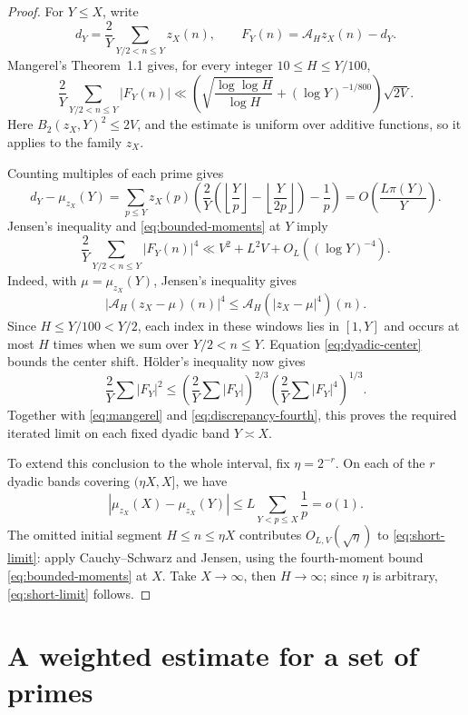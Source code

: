 \documentclass[11pt]{article}
\numberwithin{equation}{section}
\begin{document}
\begin{proof}
For $Y\le X$, write
\[
 d_Y=\frac2Y\sum_{Y/2<n\le Y}z_X(n),\qquad
 F_Y(n)=\mathcal A_Hz_X(n)-d_Y.
\]
Mangerel's Theorem~1.1 \cite{Mangerel} gives, for every integer
$10\le H\le Y/100$,
\begin{equation}\label{eq:mangerel}
 \frac2Y\sum_{Y/2<n\le Y}|F_Y(n)|
 \ll\left(\sqrt{\frac{\log\log H}{\log H}}
                +(\log Y)^{-1/800}\right)\sqrt{2V}.
\end{equation}
Here $B_2(z_X,Y)^2\le 2V$, and the estimate is uniform over additive
functions, so it applies to the family $z_X$.

Counting multiples of each prime gives
\begin{equation}\label{eq:dyadic-center}
 d_Y-\mu_{z_X}(Y)
 =\sum_{p\le Y}z_X(p)
 \left(\frac2Y\left(\left\lfloor\frac Yp\right\rfloor
       -\left\lfloor\frac Y{2p}\right\rfloor\right)-\frac1p\right)
 =O\left(\frac{L\pi(Y)}Y\right).
\end{equation}
Jensen's inequality and \eqref{eq:bounded-moments} at $Y$ imply
\begin{equation}\label{eq:discrepancy-fourth}
 \frac2Y\sum_{Y/2<n\le Y}|F_Y(n)|^4
 \ll V^2+L^2V+O_L((\log Y)^{-4}).
\end{equation}
Indeed, with $\mu=\mu_{z_X}(Y)$, Jensen's inequality gives
\[
 |\mathcal A_H(z_X-\mu)(n)|^4
 \le \mathcal A_H(|z_X-\mu|^4)(n).
\]
Since $H\le Y/100<Y/2$, each index in these windows lies in $[1,Y]$
and occurs at most $H$ times when we sum over $Y/2<n\le Y$.
Equation \eqref{eq:dyadic-center} bounds the center shift.
H\"older's inequality now gives
\[
 \frac2Y\sum|F_Y|^2
 \le\left(\frac2Y\sum|F_Y|\right)^{2/3}
       \left(\frac2Y\sum|F_Y|^4\right)^{1/3}.
\]
Together with \eqref{eq:mangerel} and
\eqref{eq:discrepancy-fourth}, this proves the required iterated limit
on each fixed dyadic band $Y\asymp X$.

To extend this conclusion to the whole interval, fix $\eta=2^{-r}$.
On each of the $r$ dyadic bands covering $(\eta X,X]$, we have
\[
 |\mu_{z_X}(X)-\mu_{z_X}(Y)|
 \le L\sum_{Y<p\le X}\frac1p=o(1).
\]
The omitted initial segment $H\le n\le\eta X$ contributes
$O_{L,V}(\sqrt\eta)$ to \eqref{eq:short-limit}: apply
Cauchy--Schwarz and Jensen, using the fourth-moment bound
\eqref{eq:bounded-moments} at $X$. Take $X\to\infty$, then
$H\to\infty$; since $\eta$ is arbitrary, \eqref{eq:short-limit} follows.
\end{proof}

\section{A weighted estimate for a set of primes}
\end{document}
